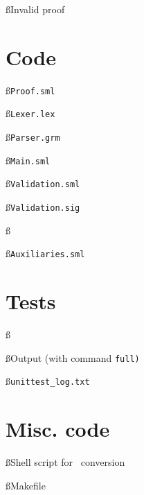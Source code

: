 \documentclass[a4paper]{article}
\begin{document}
\ss{Invalid proof}

\clearpage
\section{Code}\label{code}
\ss{\tt{Proof.sml}}\label{Proof}

\ss{\tt{Lexer.lex}}\label{Lexer}

\ss{\tt{Parser.grm}}\label{Parser}

\ss{\tt{Main.sml}}\label{Main}

\ss{\tt{Validation.sml}}\label{Validation.sml}

\ss{\tt{Validation.sig}}\label{Validation.sig}

\ss{\tt{\contentfile}}\label{\contentfile}

\ss{\tt{Auxiliaries.sml}}\label{Auxiliaries}

\clearpage
\section{Tests}\label{tests}
\ss{\tt{\testfile}}\label{\testfile}

\ss{Output (with command \tt{full})}\label{testout}

\ss{\tt{unittest\_log.txt}}\label{log}

\clearpage
\section{Misc. code}\label{misc}
\ss{Shell script for \bp\ conversion}

\label{LastPage} %
\ss{Makefile}\label{mkfile}
\label{LastApp}
\end{document}
